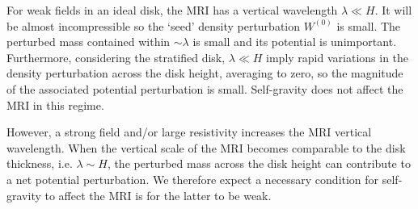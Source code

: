 
 For weak fields in an ideal disk, the MRI has a vertical
 wavelength $\lambda \ll H$. It will be almost incompressible so the 
 `seed' density perturbation $W^{(0)}$ is small.  
 The perturbed mass contained within 
 $\sim \lambda$ is small and its potential is
 unimportant. Furthermore, considering the stratified  
 disk, $\lambda\ll H$ imply rapid variations in the density
 perturbation across the disk height, averaging to zero, so the
 magnitude of the associated potential perturbation is small. 
 Self-gravity does not affect the MRI in this regime.   
 

 However, a strong field and/or large resistivity increases the MRI
 vertical wavelength. When the vertical scale of the MRI becomes
 comparable to the disk thickness, i.e. $\lambda\sim H$, the
 perturbed mass across the disk height can contribute to a net potential
 perturbation. We therefore expect a necessary condition for
 self-gravity to affect the MRI is for the latter to be weak. 

